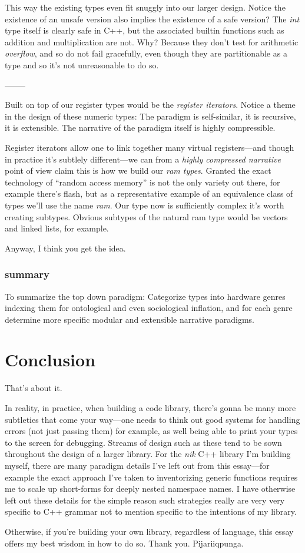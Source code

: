 \documentclass[twoside]{article}
\begin{document}
This way the existing types even fit snuggly into our larger design. Notice the existence of an unsafe version also implies
the existence of a safe version? The \emph{int} type itself is clearly safe in C++, but the associated builtin functions
such as addition and multiplication are not.  Why? Because they don't test for arithmetic \emph{overflow}, and so do not
fail gracefully, even though they are partitionable as a type and so it's not unreasonable to do so.

--------

Built on top of our register types would be the \emph{register iterators}. Notice a theme in the design of these numeric types:
The paradigm is self-similar, it is recursive, it is extensible. The narrative of the paradigm itself is highly compressible.

Register iterators allow one to link together many virtual registers---and though in practice it's subtlely different---we
can from a \emph{highly compressed narrative} point of view claim this is how we build our \emph{ram types}.
Granted the exact technology of ``random access memory'' is not the only variety out there, for example there's flash,
but as a representative example of an equivalence class of types we'll use the name \emph{ram}. Our type now is
sufficiently complex it's worth creating subtypes. Obvious subtypes of the natural ram type would be vectors
and linked lists, for example.

Anyway, I think you get the idea.

\subsubsection*{summary}

To summarize the top down paradigm: Categorize types into hardware genres indexing them for ontological and even sociological
inflation, and for each genre determine more specific modular and extensible narrative paradigms.

\section*{Conclusion}

That's about it.

In reality, in practice, when building a code library, there's gonna be many more subtleties that
come your way---one needs to think out good systems for handling errors (not just passing them) for example,
as well being able to print your types to the screen for debugging. Streams of design such as these tend to be
sown throughout the design of a larger library. For the \emph{nik} C++ library I'm building myself, there are
many paradigm details I've left out from this essay---for example the exact approach I've taken to inventorizing
generic functions requires me to scale up short-forms for deeply nested namespace names. I have otherwise left out
these details for the simple reason such strategies really are very very specific to C++ grammar not to mention
specific to the intentions of my library.

Otherwise, if you're building your own library, regardless of language, this essay offers my best wisdom in how to do so.
Thank you. Pijariiqpunga.
\end{document}
